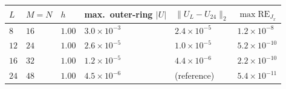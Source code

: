 \begin{tabular}{llllll}
\toprule
\(L\) & \(M=N\) & \(h\) & max.\ outer-ring \(|U|\) & \(\|U_L-U_{24}\|_2\) & \(\max\mathrm{RE}_{J_x}\) \\
\midrule
\(8\) & \(16\) & \(1.00\) & \(3.0\times10^{-3}\) & \(2.4\times10^{-5}\) & \(1.2\times10^{-8}\) \\
\(12\) & \(24\) & \(1.00\) & \(2.6\times10^{-5}\) & \(1.0\times10^{-5}\) & \(5.2\times10^{-10}\) \\
\(16\) & \(32\) & \(1.00\) & \(1.2\times10^{-5}\) & \(4.4\times10^{-6}\) & \(2.2\times10^{-10}\) \\
\(24\) & \(48\) & \(1.00\) & \(4.5\times10^{-6}\) & (reference) & \(5.4\times10^{-11}\) \\
\bottomrule
\end{tabular}

